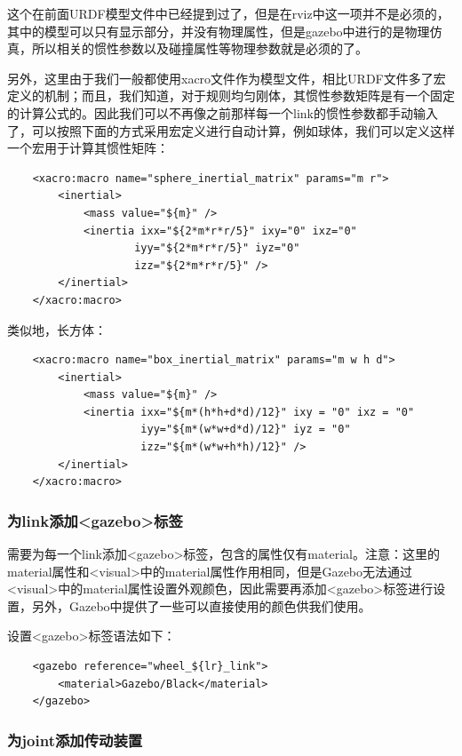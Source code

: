\documentclass[10pt, oneside]{book}
\begin{document}
这个在前面URDF模型文件中已经提到过了，但是在rviz中这一项并不是必须的，其中的模型可以只有显示部分，并没有物理属性，但是gazebo中进行的是物理仿真，所以相关的惯性参数以及碰撞属性等物理参数就是必须的了。

另外，这里由于我们一般都使用xacro文件作为模型文件，相比URDF文件多了宏定义的机制；而且，我们知道，对于规则均匀刚体，其惯性参数矩阵是有一个固定的计算公式的。因此我们可以不再像之前那样每一个link的惯性参数都手动输入了，可以按照下面的方式采用宏定义进行自动计算，例如球体，我们可以定义这样一个宏用于计算其惯性矩阵：

\begin{verbatim}
    <xacro:macro name="sphere_inertial_matrix" params="m r">
        <inertial>
            <mass value="${m}" />
            <inertia ixx="${2*m*r*r/5}" ixy="0" ixz="0"
                    iyy="${2*m*r*r/5}" iyz="0" 
                    izz="${2*m*r*r/5}" />
        </inertial>
    </xacro:macro>
\end{verbatim}

类似地，长方体：

\begin{verbatim}
    <xacro:macro name="box_inertial_matrix" params="m w h d">
        <inertial>
            <mass value="${m}" />
            <inertia ixx="${m*(h*h+d*d)/12}" ixy = "0" ixz = "0"
                     iyy="${m*(w*w+d*d)/12}" iyz = "0"
                     izz="${m*(w*w+h*h)/12}" /> 
        </inertial>
    </xacro:macro>
\end{verbatim}

\subsubsection{为link添加<gazebo>标签}

需要为每一个link添加<gazebo>标签，包含的属性仅有material。注意：这里的material属性和<visual>中的material属性作用相同，但是Gazebo无法通过<visual>中的material属性设置外观颜色，因此需要再添加<gazebo>标签进行设置，另外，Gazebo中提供了一些可以直接使用的颜色供我们使用。

设置<gazebo>标签语法如下：

\begin{verbatim}
    <gazebo reference="wheel_${lr}_link">
        <material>Gazebo/Black</material>
    </gazebo>
\end{verbatim}

\subsubsection{为joint添加传动装置}
\end{document}

